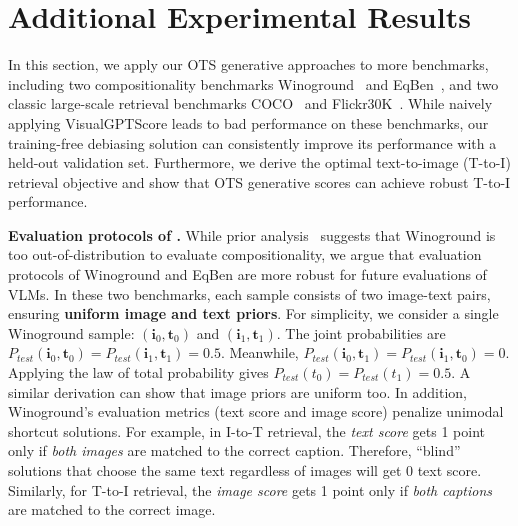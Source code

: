 \documentclass{article} \usepackage{iclr2024_conference,times}
\begin{document}
\section{Additional Experimental Results}
\label{sec:additional_exp}
In this section, we apply our OTS generative approaches to more benchmarks, including two compositionality benchmarks Winoground~\citep{winoground} and EqBen~\citep{eqben}, and two classic large-scale retrieval benchmarks COCO~\citep{coco} and Flickr30K~\citep{flickr30k}. While naively applying VisualGPTScore leads to bad performance on these benchmarks, our training-free debiasing solution can consistently improve its performance with a held-out validation set. Furthermore, we derive the optimal text-to-image (T-to-I) retrieval objective and show that OTS generative scores can achieve robust T-to-I performance. 

{\bf Evaluation protocols of \citet{winoground}.} While prior analysis~\citep{diwan2022winoground, aro} suggests that Winoground is too out-of-distribution to evaluate compositionality, we argue that evaluation protocols of Winoground and EqBen are more robust for future evaluations of VLMs. In these two benchmarks, each sample consists of two image-text pairs, ensuring {\bf uniform image and text priors}. For simplicity, we consider a single Winoground sample: $(\mathbf{i}_0, \mathbf{t}_0)$ and $(\mathbf{i}_1, \mathbf{t}_1)$. The joint probabilities are $P_{test}(\mathbf{i}_0, \mathbf{t}_0) = P_{test}(\mathbf{i}_1, \mathbf{t}_1) = 0.5$. Meanwhile, $P_{test}(\mathbf{i}_0, \mathbf{t}_1) = P_{test}(\mathbf{i}_1, \mathbf{t}_0) = 0$. Applying the law of total probability gives $P_{test}(t_0) = P_{test}(t_1) = 0.5$. A similar derivation can show that image priors are uniform too. In addition, Winoground's evaluation metrics (text score and image score) penalize unimodal shortcut solutions. For example, in I-to-T retrieval, the {\em text score} gets 1 point only if {\em both images} are matched to the correct caption. Therefore, ``blind'' solutions that choose the same text regardless of images will get 0 text score. Similarly, for T-to-I retrieval, the {\em image score} gets 1 point only if {\em both captions} are matched to the correct image.
\end{document}

